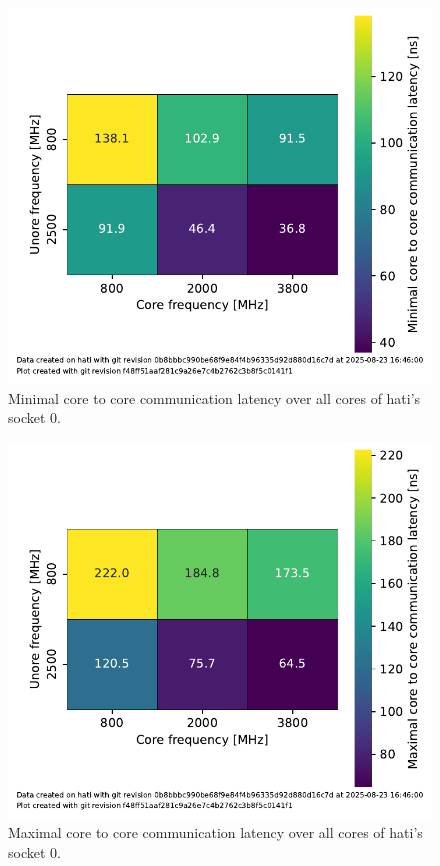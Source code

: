 \begin{figure}[]
    \centering
    \includegraphics[width=0.8\columnwidth]{fig/core-to-core-latency/all-to-all-heatmap-min.pdf}
    \caption{\label{fig:cbo-latencies-socket-min}Minimal core to core communication latency over all cores of hati's socket 0.}
\end{figure}
\begin{figure}[]
    \centering
    \includegraphics[width=0.8\columnwidth]{fig/core-to-core-latency/all-to-all-heatmap-max.pdf}
    \caption{\label{fig:cbo-latencies-socket-max}Maximal core to core communication latency over all cores of hati's socket 0.}
\end{figure}

